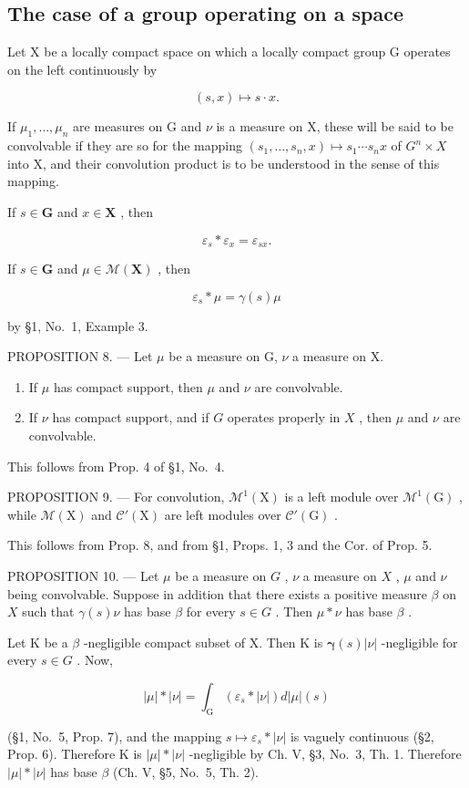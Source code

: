 \subsection{The case of a group operating on a space}

Let X be a locally compact space on which a locally compact group G operates on the left continuously by

\[
(s, x) \mapsto s \cdot x.
\]

If \(\mu_{1},\ldots,\mu_{n}\) are measures on G and \(\nu\) is a measure on X, these will be said to be convolvable if they are so for the mapping \((s_{1},\ldots,s_{n},x)\mapsto s_{1}\cdots s_{n}x\) of \(G^{n}\times X\) into X, and their convolution product is to be understood in the sense of this mapping.

If \(s\in \mathbf{G}\) and \(x\in \mathbf{X}\) , then

\[
\varepsilon_ {s} * \varepsilon_ {x} = \varepsilon_ {s x}.\tag{4}
\]

If \(s \in \mathbf{G}\) and \(\mu \in \mathcal{M}(\mathbf{X})\) , then

\[
\varepsilon_ {s} * \mu = \gamma (s) \mu\tag{5}
\]

by §1, No.~1, Example 3.

PROPOSITION 8. --- Let \(\mu\) be a measure on G, \(\nu\) a measure on X.

\begin{enumerate}
\def\labelenumi{(\roman{enumi})}
\item
  If \(\mu\) has compact support, then \(\mu\) and \(\nu\) are convolvable.
\item
  If \(\nu\) has compact support, and if \(G\) operates properly in \(X\) , then \(\mu\) and \(\nu\) are convolvable.
\end{enumerate}

This follows from Prop. 4 of §1, No.~4.

PROPOSITION 9. --- For convolution, \(\mathcal{M}^{1}(\mathrm{X})\) is a left module over \(\mathcal{M}^{1}(\mathrm{G})\) , while \(\mathcal{M}(\mathrm{X})\) and \(\mathcal{C}'(\mathrm{X})\) are left modules over \(\mathcal{C}'(\mathrm{G})\) .

This follows from Prop. 8, and from §1, Props. 1, 3 and the Cor. of Prop. 5.

PROPOSITION 10. --- Let \(\mu\) be a measure on \(G\) , \(\nu\) a measure on \(X\) , \(\mu\) and \(\nu\) being convolvable. Suppose in addition that there exists a positive measure \(\beta\) on \(X\) such that \(\gamma(s)\nu\) has base \(\beta\) for every \(s \in G\) . Then \(\mu * \nu\) has base \(\beta\) .

Let K be a \(\beta\) -negligible compact subset of X. Then K is \(\pmb{\gamma}(s)|\nu|\) -negligible for every \(s \in G\) . Now,

\[
| \mu | * | \nu | = \int_ {\mathrm{G}} (\varepsilon_ {s} * | \nu |) d | \mu | (s)
\]

(§1, No.~5, Prop. 7), and the mapping \(s \mapsto \varepsilon_s * |\nu|\) is vaguely continuous (§2, Prop. 6). Therefore K is \(|\mu| * |\nu|\) -negligible by Ch. V, §3, No.~3, Th. 1. Therefore \(|\mu| * |\nu|\) has base \(\beta\) (Ch. V, §5, No.~5, Th. 2).
\relax{}
